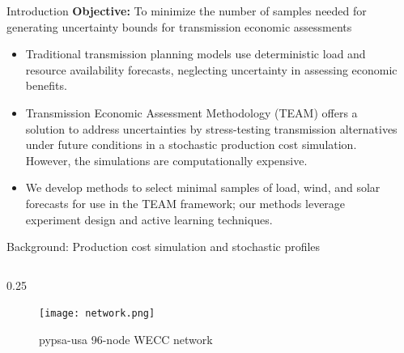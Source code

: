 \documentclass[final]{beamer}
\newlength{\sepwidth}
\newlength{\colwidth}
\newcommand{\separatorcolumn}{\begin{column}{\sepwidth}\end{column}}
\begin{document}
\begin{frame}[t]
\begin{columns}[t]
\separatorcolumn

\begin{column}{\colwidth}
  \vspace*{-10}
  \begin{block}{Introduction}
    \textbf{Objective:} To minimize the number of samples needed for generating uncertainty bounds for transmission economic assessments
    \begin{itemize}
      \item Traditional transmission planning models use deterministic load and resource availability forecasts, neglecting uncertainty in assessing economic benefits.
      \item Transmission Economic Assessment Methodology (TEAM) offers a solution to address uncertainties by stress-testing transmission alternatives under future conditions in a stochastic production cost simulation. However, the simulations are computationally expensive.
      \item We develop methods to select minimal samples of load, wind, and solar forecasts for use in the TEAM framework; our methods leverage experiment design and active learning techniques. 
  \end{itemize}
  \end{block}

  \vspace*{-10}
  \begin{block}{Background: Production cost simulation and stochastic profiles}
    \begin{column}{0.25\colwidth}
      \vspace*{-10}
      \begin{figure}[h]
        \centering
        \texttt{[image: network.png]}
        \caption{pypsa-usa 96-node WECC network}
      \end{figure}


\end{column}
\end{block}
\end{column}
\end{columns}
\end{frame}
\end{document}
